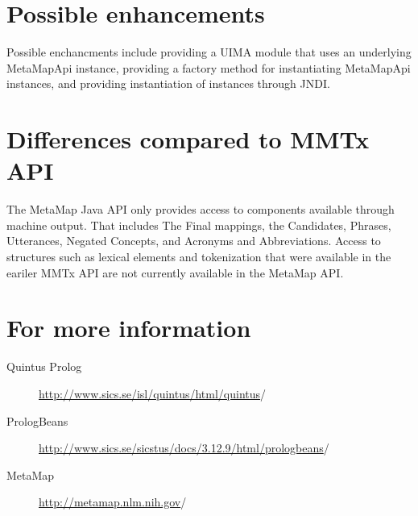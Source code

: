 \documentclass[11pt]{article}
\begin{document}
\section{Possible enhancements}
\label{Possible enhancements}

Possible enchancments include providing a UIMA module that uses an
underlying MetaMapApi instance, providing a factory method for
instantiating MetaMapApi instances, and providing instantiation of
instances through JNDI.


\section{Differences compared to MMTx API}
\label{Differences compared to MMTx API}

The MetaMap Java API only provides access to components available
through machine output.  That includes The Final mappings, the
Candidates, Phrases, Utterances, Negated Concepts, and Acronyms and
Abbreviations.  Access to structures such as lexical elements and
tokenization that were available in the eariler MMTx API are not
currently available in the MetaMap API.


\section{For more information}
\label{For more information}
\begin{description}
\item[Quintus Prolog]  \url{http://www.sics.se/isl/quintus/html/quintus}/
\item[PrologBeans]  \url{http://www.sics.se/sicstus/docs/3.12.9/html/prologbeans}/
\item[MetaMap]  \url{http://metamap.nlm.nih.gov}/
\end{description}
\end{document}
